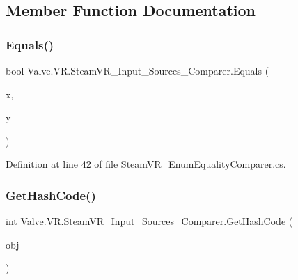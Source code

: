 \subsection{Member Function Documentation}
\mbox{\label{struct_valve_1_1_v_r_1_1_steam_v_r___input___sources___comparer_a72ee41670a6cf4efc31f26d082910ee1}} 
\subsubsection{\texorpdfstring{Equals()}{Equals()}}
{\footnotesize\ttfamily bool Valve.\+V\+R.\+Steam\+V\+R\+\_\+\+Input\+\_\+\+Sources\+\_\+\+Comparer.\+Equals (\begin{DoxyParamCaption}\item[{\mbox{\hyperlink{namespace_valve_1_1_v_r_a82e5bf501cc3aa155444ee3f0662853f}{Steam\+V\+R\+\_\+\+Input\+\_\+\+Sources}}}]{x,  }\item[{\mbox{\hyperlink{namespace_valve_1_1_v_r_a82e5bf501cc3aa155444ee3f0662853f}{Steam\+V\+R\+\_\+\+Input\+\_\+\+Sources}}}]{y }\end{DoxyParamCaption})}



Definition at line 42 of file Steam\+V\+R\+\_\+\+Enum\+Equality\+Comparer.\+cs.

\mbox{\label{struct_valve_1_1_v_r_1_1_steam_v_r___input___sources___comparer_ac1b532ee970421af68db90d677f92596}} 
\subsubsection{\texorpdfstring{GetHashCode()}{GetHashCode()}}
{\footnotesize\ttfamily int Valve.\+V\+R.\+Steam\+V\+R\+\_\+\+Input\+\_\+\+Sources\+\_\+\+Comparer.\+Get\+Hash\+Code (\begin{DoxyParamCaption}\item[{\mbox{\hyperlink{namespace_valve_1_1_v_r_a82e5bf501cc3aa155444ee3f0662853f}{Steam\+V\+R\+\_\+\+Input\+\_\+\+Sources}}}]{obj }\end{DoxyParamCaption})}



